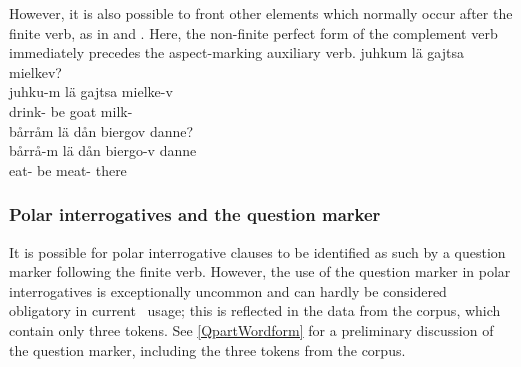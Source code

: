 However, it is also possible to front other elements which normally occur after the finite verb, as in  and . Here, the non-finite perfect form of the complement verb immediately precedes the aspect-marking auxiliary verb.
\ea\label{polarQinversion5}%
\glll	juhkum lä gajtsa mielkev?\\
	juhku-m lä gajtsa mielke-v\\
	drink- be\BS{} goat\BS{} milk-\\\nopagebreak
{} 
\z
\ea\label{polarQinversion6}
\glll	bårråm lä dån biergov danne?\\
	bårrå-m lä dån biergo-v danne\\
	eat- be\BS{}  meat- there\\\nopagebreak
{} 
\z


\subsubsection{Polar interrogatives and the question marker}\label{Qparticle}
It is possible for polar interrogative clauses to be identified as such by a question marker \TILDE{} following the finite verb. However, the use of the question marker in polar interrogatives is exceptionally uncommon and can hardly be considered obligatory in current \PS\ usage; this is reflected in the data from the corpus, which contain only three tokens. See \SEC\ref{QpartWordform} for a preliminary discussion of the question marker, including the three tokens from the corpus. %


